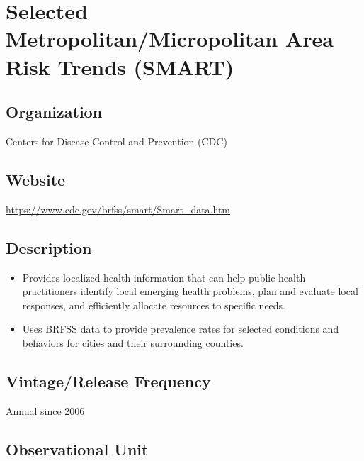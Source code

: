 \documentclass[
]{book}
\providecommand{\tightlist}{%
  \setlength{\itemsep}{0pt}\setlength{\parskip}{0pt}}
\begin{document}
\mainmatter

\hypertarget{selected-metropolitanmicropolitan-area-risk-trends-smart}{%
\chapter{Selected Metropolitan/Micropolitan Area Risk Trends (SMART)}\label{selected-metropolitanmicropolitan-area-risk-trends-smart}}

\hypertarget{organization-77}{%
\section{Organization}\label{organization-77}}

Centers for Disease Control and Prevention (CDC)

\hypertarget{website-77}{%
\section{Website}\label{website-77}}

\url{https://www.cdc.gov/brfss/smart/Smart_data.htm}

\hypertarget{description-77}{%
\section{Description}\label{description-77}}

\begin{itemize}
\tightlist
\item
  Provides localized health information that can help public health practitioners identify local emerging health problems, plan and evaluate local responses, and efficiently allocate resources to specific needs.
\item
  Uses BRFSS data to provide prevalence rates for selected conditions and behaviors for cities and their surrounding counties.
\end{itemize}

\hypertarget{vintagerelease-frequency-77}{%
\section{Vintage/Release Frequency}\label{vintagerelease-frequency-77}}

Annual since 2006

\hypertarget{observational-unit-77}{%
\section{Observational Unit}\label{observational-unit-77}}
\end{document}
